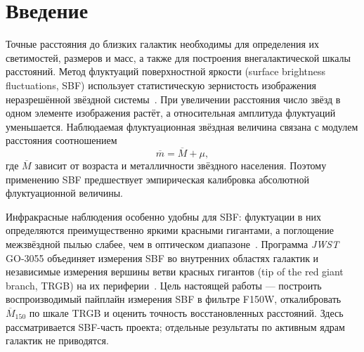 \begin{abstract}
The surface brightness fluctuation (SBF) part of the project is presented. Distances are measured from \textit{James Webb Space Telescope} NIRCam images of 14 early-type galaxies observed in programme GO-3055. Smooth isophotal galaxy models were constructed, residual images were obtained, and fluctuation power spectra were measured in F150W. The absolute fluctuation magnitude was calibrated with individual tip of the red giant branch (TRGB) distances. For the primary sample of 12 galaxies we obtain
$\overline M_{150}=(-3.454\pm0.013)+(1.17\pm0.21)[(F090W-F150W)-0.40]$.
Leave-one-out validation gives a weighted distance-modulus scatter of $0.073$ mag, or approximately $3.4\%$ in distance. The mean offset from the reference TRGB scale is $0.003\pm0.019$ mag. A comparison of five overlapping galaxies with the HST/F160W calibration gives an offset of $-0.063\pm0.067$ mag.

\emph{Keywords:} surface brightness fluctuations, distance scale, galaxies, JWST, NIRCam, TRGB.
\end{abstract}

\section{Введение}

Точные расстояния до близких галактик необходимы для определения их светимостей, размеров и масс, а также для построения внегалактической шкалы расстояний. Метод флуктуаций поверхностной яркости (surface brightness fluctuations, SBF) использует статистическую зернистость изображения неразрешённой звёздной системы~\cite{TonrySchneider1988}. При увеличении расстояния число звёзд в одном элементе изображения растёт, а относительная амплитуда флуктуаций уменьшается. Наблюдаемая флуктуационная звёздная величина связана с модулем расстояния соотношением
\begin{equation}
    \overline m=\overline M+\mu,
    \label{buk:eq:distance_modulus}
\end{equation}
где $\overline M$ зависит от возраста и металличности звёздного населения. Поэтому применению SBF предшествует эмпирическая калибровка абсолютной флуктуационной величины.

Инфракрасные наблюдения особенно удобны для SBF: флуктуации в них определяются преимущественно яркими красными гигантами, а поглощение межзвёздной пылью слабее, чем в оптическом диапазоне~\cite{Jensen2015,Blakeslee2021}. Программа \textit{JWST} GO-3055 объединяет измерения SBF во внутренних областях галактик и независимые измерения вершины ветви красных гигантов (tip of the red giant branch, TRGB) на их периферии~\cite{Anand2024,Jensen2025,Chazov2026}. Цель настоящей работы --- построить воспроизводимый пайплайн измерения SBF в фильтре F150W, откалибровать $\overline M_{150}$ по шкале TRGB и оценить точность восстановленных расстояний. Здесь рассматривается SBF-часть проекта; отдельные результаты по активным ядрам галактик не приводятся.

